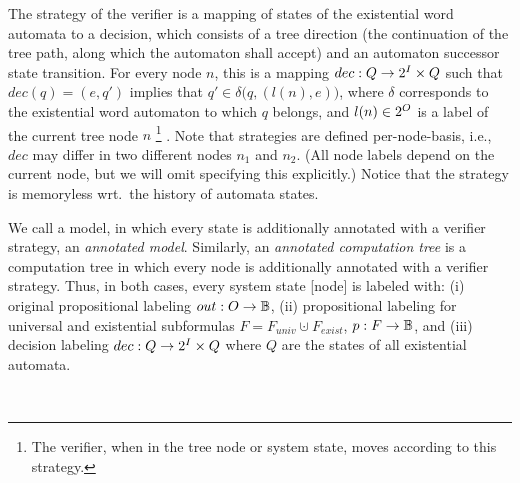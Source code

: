 The strategy of the verifier is a mapping of states of the existential word automata
to a decision,
which consists of a tree direction
(the continuation of the tree path, along which the automaton shall accept)
and an automaton successor state transition.
For every node $n$, this is a mapping
$dec: Q \rightarrow {2^I} \times Q$ \label{page:decision-mapping}
such that $dec(q)=(e,q')$ implies that $q' \in \delta\big(q,(l(n),e)\big)$,
where $\delta$ corresponds to the existential word automaton to which $q$ belongs,
and $l(n) \in {2^O}$ is a label of the current tree node $n$%
\footnote{%
  The verifier, when in the tree node or system state, moves according to this strategy.}%
.
Note that strategies are defined per-node-basis,
i.e., $dec$ may differ in two different nodes $n_1$ and $n_2$.
(All node labels depend on the current node, but we will omit specifying this explicitly.)
Notice that the strategy is memoryless wrt.\ the history of automata states.

We call a model, in which every state is additionally annotated with a verifier strategy, an \emph{annotated model}.
Similarly, an \emph{annotated computation tree} is a computation tree in which every node is additionally annotated with a verifier strategy.
Thus, in both cases, every system state [node] is labeled with:
(i) original propositional labeling $out: O \to \mathbb{B}$,
(ii) propositional labeling for universal and existential subformulas $F=F_\textit{univ}\cupdot F_\textit{exist}$, $p: F \to \mathbb{B}$, and
(iii) decision labeling $dec: Q \to {2^I} \times Q$ where $Q$ are the states of all existential automata.
\label{page:def:annotated-tree}

\



